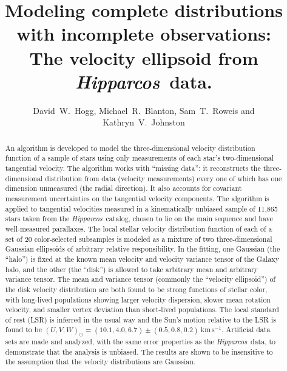 \documentclass[12pt,preprint]{aastex}
\newcounter{address}
\newcommand{\Hipparcos}{\textit{Hipparcos}}
\begin{document}
\title{
  Modeling complete distributions with incomplete observations:\\
  The velocity ellipsoid from \Hipparcos\ data.
}
\author{
  David~W.~Hogg\altaffilmark{\ref{NYU},\ref{email}},
  Michael~R.~Blanton\altaffilmark{\ref{NYU}},
  Sam~T.~Roweis\altaffilmark{\ref{Toronto}} and
  Kathryn~V.~Johnston\altaffilmark{\ref{Wesleyan}}
}

\setcounter{address}{1}

\begin{abstract}
An algorithm is developed to model the three-dimensional velocity
distribution function of a sample of stars using only measurements of
each star's two-dimensional tangential velocity.  The algorithm works
with ``missing data'': it reconstructs the three-dimensional
distribution from data (velocity measurements) every one of which has
one dimension unmeasured (the radial direction).  It also accounts for
covariant measurement uncertainties on the tangential velocity
components.  The algorithm is applied to tangential velocities
measured in a kinematically unbiased sample of 11,865 stars taken from
the \Hipparcos\ catalog, chosen to lie on the main sequence and have
well-measured parallaxes.  The local stellar velocity distribution
function of each of a set of 20 color-selected subsamples is modeled
as a mixture of two three-dimensional Gaussian ellipsoids of arbitrary
relative responsibility.  In the fitting, one Gaussian (the ``halo'')
is fixed at the known mean velocity and velocity variance tensor of
the Galaxy halo, and the other (the ``disk'') is allowed to take
arbitrary mean and arbitrary variance tensor.  The mean and variance
tensor (commonly the ``velocity ellipsoid'') of the disk velocity
distribution are both found to be strong functions of stellar color,
with long-lived populations showing larger velocity dispersion, slower
mean rotation velocity, and smaller vertex deviation than short-lived
populations.  The local standard of rest (LSR) is inferred in the
usual way and the Sun's motion relative to the LSR is found to be
$(U,V,W)_{\odot}=(10.1,4.0,6.7)\pm(0.5,0.8,0.2)~\mathrm{km\,s^{-1}}$.
Artificial data sets are made and analyzed, with the same error
properties as the \Hipparcos\ data, to demonstrate that the analysis
is unbiased.  The results are shown to be insensitive to the
assumption that the velocity distributions are Gaussian.
\end{abstract}
\end{document}

